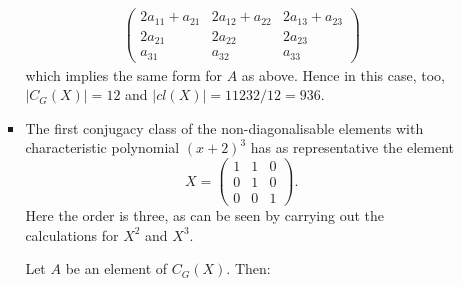 \documentclass[11pt]{article} \usepackage{amssymb}
\begin{document}
\begin{enumerate}
\begin{enumerate}
\begin{itemize}
\begin{eqnarray*}
\begin{pmatrix}
            2a_{11}+a_{21}&2a_{12}+a_{22}  &2a_{13}+a_{23} \\ 
            2a_{21}&2a_{22}  &2a_{23} \\ 
            a_{31}&a_{32}  &a_{33} 
          \end{pmatrix}
        \end{eqnarray*}
        which implies the same form for $A$ as above. Hence in this case, too,
        $|C_G(X)|=12$ and $|cl(X)|=11232/12=936$.
      \item
        The first conjugacy class of the non-diagonalisable elements with 
        characteristic polynomial
        $(x+2)^3$ has as representative the element
        \begin{equation*}
          X=
          \begin{pmatrix}
            1&1  &0 \\ 
            0&1  &0 \\ 
            0&0  &1 
          \end{pmatrix}.
        \end{equation*}
        Here the order is three, as can be seen by carrying out the 
        calculations for $X^2$ and $X^3$.

        Let $A$ be an element of $C_G(X)$. Then:
        

\end{itemize}
\end{enumerate}
\end{enumerate}
\end{document}
